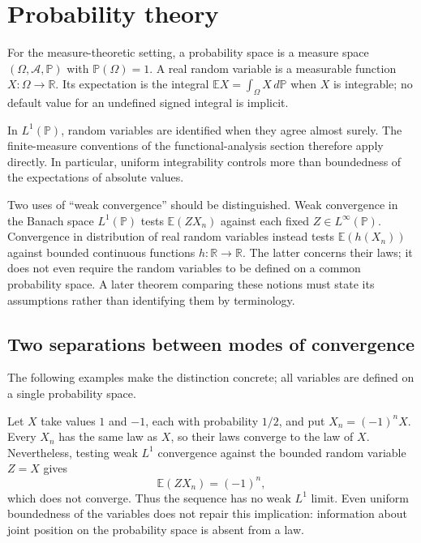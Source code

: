 \def\topic{Probability theory}

\section{Probability theory}
For the measure-theoretic setting, a probability space is a measure
space $(\Omega,\mathcal{A},\mathbb{P})$ with
$\mathbb{P}(\Omega)=1$. A real random variable is a measurable function
$X:\Omega\to\mathbb{R}$. Its expectation is the integral
$\mathbb{E}X=\int_\Omega X\,d\mathbb{P}$ when $X$ is integrable;
no default value for an undefined signed integral is implicit.

In $L^1(\mathbb{P})$, random variables are identified when they agree
almost surely. The finite-measure conventions of the functional-analysis
section therefore apply directly. In particular, uniform integrability
controls more than boundedness of the expectations of absolute values.

Two uses of ``weak convergence'' should be distinguished. Weak convergence
in the Banach space $L^1(\mathbb{P})$ tests
$\mathbb{E}(ZX_n)$ against each fixed $Z\in L^\infty(\mathbb{P})$.
Convergence in distribution of real random variables instead tests
$\mathbb{E}(h(X_n))$ against bounded continuous functions
$h:\mathbb{R}\to\mathbb{R}$. The latter concerns their laws; it does
not even require the random variables to be defined on a common
probability space. A later theorem comparing these notions must state
its assumptions rather than identifying them by terminology.

\subsection{Two separations between modes of convergence}
The following examples make the distinction concrete; all variables
are defined on a single probability space.

\begin{example}
Let $X$ take values $1$ and $-1$, each with probability $1/2$, and put
$X_n=(-1)^nX$. Every $X_n$ has the same law as $X$, so their laws
converge to the law of $X$. Nevertheless, testing weak $L^1$
convergence against the bounded random variable $Z=X$ gives
\[
\mathbb{E}(ZX_n)=(-1)^n,
\]
which does not converge. Thus the sequence has no weak $L^1$ limit.
Even uniform boundedness of the variables does not repair this
implication: information about joint position on the probability
space is absent from a law.
\end{example}


